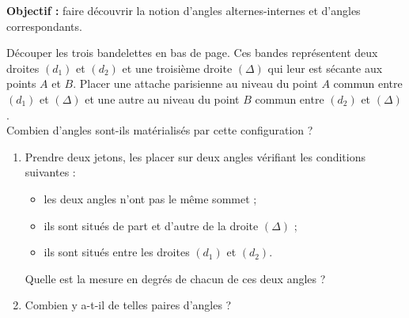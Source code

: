 \begin{activite}
    \vspace*{-7mm}    
    {\bf Objectif :} faire découvrir la notion d'angles alternes-internes et d'angles correspondants.
    {\renewcommand{\baselinestretch}{1.15}\selectfont    
    \vspace*{-3mm}
    \partie[préparation]
    \vspace*{-5mm}
       Découper les trois bandelettes en bas de page. Ces bandes représentent deux droites $(d_1)$ et $(d_2)$ et une troisième droite $(\Delta)$ qui leur est sécante aux points $A$ et $B$. Placer une attache parisienne au niveau du point $A$ commun entre $(d_1)$ et $(\Delta)$ et une autre au niveau du point $B$ commun entre $(d_2)$ et $(\Delta)$. \\
       Combien d'angles sont-ils matérialisés par cette configuration ?
    \vspace*{-3mm}
    \vspace*{-10mm}    
       \begin{enumerate}
          \item Prendre deux jetons, les placer sur deux angles vérifiant les conditions suivantes :
             \begin{itemize}
                \item les deux angles n'ont pas le même sommet ;
                \item ils sont situés de part et d'autre de la droite $(\Delta)$ ;
                \item ils sont situés \og entre \fg{} les droites $(d_1)$ et $(d_2)$.
             \end{itemize}
          Quelle est la mesure en degrés de chacun de ces deux angles ?
          \item Combien y a-t-il de telles paires d'angles ?
          

\end{enumerate}}
\end{activite}
